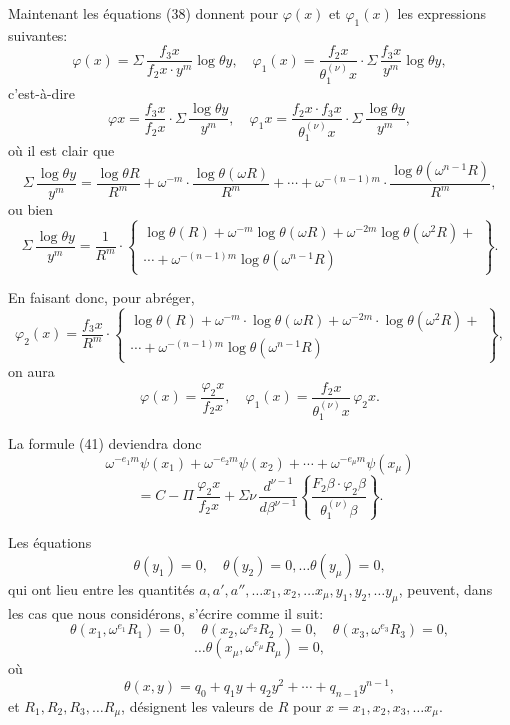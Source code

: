 \documentclass{article}
\begin{document}
Maintenant les équations (38) donnent pour $\varphi(x)$ et $\varphi_1(x)$ les expressions suivantes:
\[ \varphi(x) = \Sigma\,\frac{f_3 x}{f_2 x \cdot y^{m}}\log\theta y, \quad \varphi_1(x) = \frac{f_2 x}{\theta_1^{(\nu)} x} \cdot \Sigma\,\frac{f_3 x}{y^{m}}\log\theta y, \]
c'est-à-dire
\[ \varphi x = \frac{f_3 x}{f_2 x} \cdot \Sigma\,\frac{\log\theta y}{y^{m}}, \quad \varphi_1 x = \frac{f_2 x \cdot f_3 x}{\theta_1^{(\nu)} x} \cdot \Sigma\,\frac{\log\theta y}{y^{m}}, \]
où il est clair que
\[ \Sigma\,\frac{\log\theta y}{y^{m}} = \frac{\log\theta R}{R^{m}} + \omega^{-m} \cdot \frac{\log\theta(\omega R)}{R^{m}} + \cdots + \omega^{-(n-1)m} \cdot \frac{\log\theta(\omega^{n-1}R)}{R^{m}}, \]
ou bien
\[ \Sigma\,\frac{\log\theta y}{y^{m}} = \frac{1}{R^{m}} \cdot \left\{ \begin{array}{l} \log\theta(R)+\omega^{-m}\log\theta(\omega R)+\omega^{-2m}\log\theta(\omega^{2}R)+ \\ \cdots+\omega^{-(n-1)m}\log\theta(\omega^{n-1}R) \end{array} \right\}. \]

En faisant donc, pour abréger,
\[ \varphi_2(x) = \frac{f_3 x}{R^{m}} \cdot \left\{ \begin{array}{l} \log\theta(R)+\omega^{-m} \cdot \log\theta(\omega R)+\omega^{-2m} \cdot \log\theta(\omega^{2}R)+ \\ \cdots+\omega^{-(n-1)m}\log\theta(\omega^{n-1}R) \end{array} \right\}, \tag{132} \]
on aura
\[ \varphi(x) = \frac{\varphi_2 x}{f_2 x}, \quad \varphi_1(x) = \frac{f_2 x}{\theta_1^{(\nu)} x}\,\varphi_2 x. \tag{133} \]

La formule (41) deviendra donc
\[ \omega^{-e_1 m}\psi(x_1) + \omega^{-e_2 m}\psi(x_2) + \cdots + \omega^{-e_\mu m}\psi(x_\mu) \]
\[ = C - \Pi\,\frac{\varphi_2 x}{f_2 x} + \Sigma\nu\,\frac{d^{\nu-1}}{d\beta^{\nu-1}} \left\{ \frac{F_2\beta \cdot \varphi_2\beta}{\theta_1^{(\nu)}\beta} \right\}. \tag{134} \]

Les équations
\[ \theta(y_1) = 0, \quad \theta(y_2) = 0, \ldots \theta(y_\mu) = 0, \]
qui ont lieu entre les quantités $a, a', a'', \ldots x_1, x_2, \ldots x_\mu, y_1, y_2, \ldots y_\mu$,
peuvent, dans les cas que nous considérons, s'écrire comme il suit:
\[ \theta(x_1, \omega^{e_1}R_1) = 0, \quad \theta(x_2, \omega^{e_2}R_2) = 0, \quad \theta(x_3, \omega^{e_3}R_3) = 0, \]
\[ \ldots \theta(x_\mu, \omega^{e_\mu}R_\mu) = 0, \]
où
\[ \theta(x, y) = q_0 + q_1 y + q_2 y^{2} + \cdots + q_{n-1} y^{n-1}, \]
et $R_1, R_2, R_3, \ldots R_\mu$, désignent les valeurs de $R$ pour $x = x_1, x_2, x_3, \ldots x_\mu$.
\end{document}
